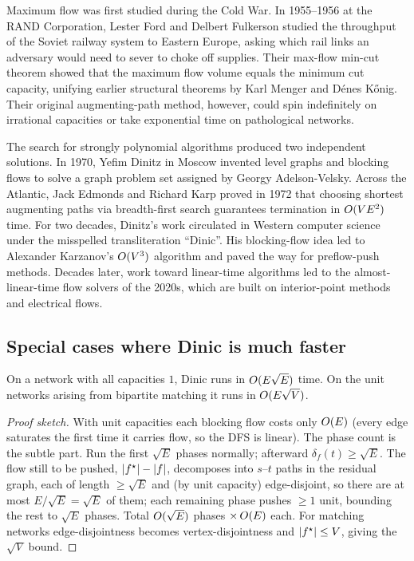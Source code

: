 \begin{historybox}
Maximum flow was first studied during the Cold War. In 1955--1956 at the RAND Corporation,
Lester Ford and Delbert Fulkerson studied the throughput of the Soviet railway system to
Eastern Europe, asking which rail links an adversary would need to sever to choke off supplies.
Their max-flow min-cut theorem showed that the maximum flow volume equals the minimum cut
capacity, unifying earlier structural theorems by Karl Menger and D{\'e}nes K{\H{o}}nig.
Their original augmenting-path method, however, could spin indefinitely on irrational capacities or
take exponential time on pathological networks.

The search for strongly polynomial algorithms produced two independent solutions. In 1970,
Yefim Dinitz in Moscow invented level graphs and blocking flows to solve a graph problem set
assigned by Georgy Adelson-Velsky. Across the Atlantic, Jack Edmonds and Richard Karp proved
in 1972 that choosing shortest augmenting paths via breadth-first search guarantees termination
in $O(V E^2)$ time. For two decades, Dinitz's work circulated in Western computer science under
the misspelled transliteration ``Dinic''. His blocking-flow idea led to Alexander
Karzanov's $O(V^3)$ algorithm and paved the way for preflow-push methods. Decades later,
work toward linear-time algorithms led to the almost-linear-time flow
solvers of the 2020s, which are built on interior-point methods and electrical flows.
\end{historybox}

\subsection{Special cases where Dinic is much faster}

\begin{theorem}
\label{ch12:thm-unit}
On a network with all capacities $1$, Dinic runs in $O(E\sqrt{E})$ time. On the
unit networks arising from bipartite matching it runs in $O(E\sqrt{V})$.
\end{theorem}

\begin{proof}[Proof sketch]
With unit capacities each blocking flow costs only $O(E)$ (every edge saturates
the first time it carries flow, so the DFS is linear). The phase count is the
subtle part. Run the first $\sqrt{E}$ phases normally; afterward $\delta_f(t)\ge
\sqrt{E}$. The flow still to be pushed, $\lvert f^\star\rvert-\lvert f\rvert$, decomposes into
$s$--$t$ paths in the residual graph, each of length $\ge\sqrt{E}$ and (by unit
capacity) edge-disjoint, so there are at most $E/\sqrt{E}=\sqrt{E}$ of them; each
remaining phase pushes $\ge 1$ unit, bounding the rest to $\sqrt{E}$ phases. Total
$O(\sqrt{E})$ phases $\times\,O(E)$ each. For matching networks
edge-disjointness becomes vertex-disjointness and $\lvert f^\star\rvert\le V$, giving the
$\sqrt V$ bound.
\end{proof}

